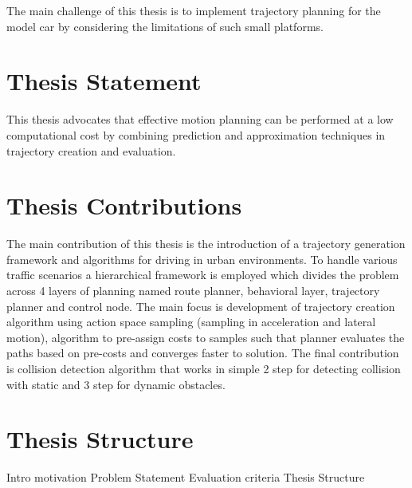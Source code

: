 The main challenge of this thesis is to implement trajectory planning for the model car by considering the limitations of such small platforms. 

\section{Thesis Statement}
This thesis advocates that effective motion planning can be performed at a low computational cost by combining prediction and approximation techniques in trajectory creation and evaluation. 

\section{Thesis Contributions}

The main contribution of this thesis is the introduction of a trajectory generation framework and algorithms for driving in urban environments. To handle various traffic scenarios a hierarchical framework is employed which divides the problem across 4 layers of planning named route planner, behavioral layer, trajectory planner and control node. The main focus is development of trajectory creation algorithm using action space sampling (sampling in acceleration and lateral motion), algorithm to pre-assign costs to samples such that planner evaluates the paths based on pre-costs and converges faster to solution. The final contribution is collision detection algorithm that works in simple 2 step for detecting collision with static and 3 step for dynamic obstacles. 

\section{Thesis Structure}



Intro
motivation
Problem Statement
Evaluation criteria
Thesis Structure
